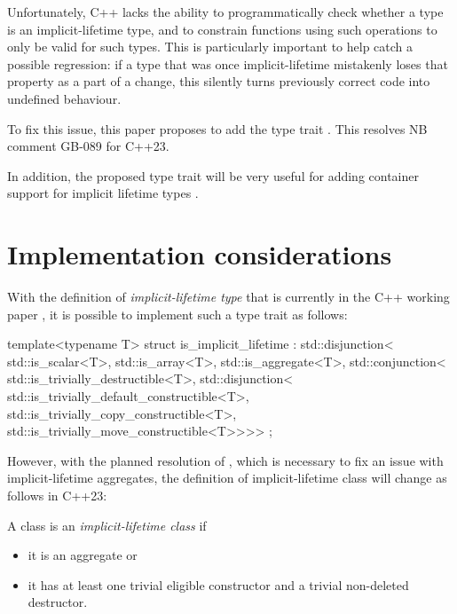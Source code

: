 Unfortunately, C++ lacks the ability to programmatically check whether a type is an implicit-lifetime type, and to constrain functions using such operations to only be valid for such types. This is particularly important to help catch a possible regression: if a type that was once implicit-lifetime mistakenly loses that property as a part of a change, this silently turns previously correct code into undefined behaviour.

To fix this issue, this paper proposes to add the type trait . This resolves NB comment GB-089 for C++23.

In addition, the proposed type trait will be very useful for adding container support for implicit lifetime types \cite{P1010R1}.

\section{Implementation considerations}

With the definition of \emph{implicit-lifetime type} that is currently in the C++ working paper \cite{N4917}, it is possible to implement such a type trait as follows:

\begin{codeblock}
template<typename T>
struct is_implicit_lifetime : std::disjunction<
    std::is_scalar<T>,
    std::is_array<T>,
    std::is_aggregate<T>,
    std::conjunction<
        std::is_trivially_destructible<T>,
        std::disjunction<
            std::is_trivially_default_constructible<T>,
            std::is_trivially_copy_constructible<T>,
            std::is_trivially_move_constructible<T>>>> {};
\end{codeblock}

However, with the planned resolution of \cite{CWG2605}, which is necessary to fix an issue with implicit-lifetime aggregates, the definition of implicit-lifetime class will change as follows in C++23:

\begin{adjustwidth}{0.5cm}{0.5cm}
A class  is an \emph{implicit-lifetime class} if 
\begin{itemize}
\item it is an aggregate  or
\item it has at least one trivial eligible constructor and a trivial non-deleted destructor.
\end{itemize}
\end{adjustwidth}

